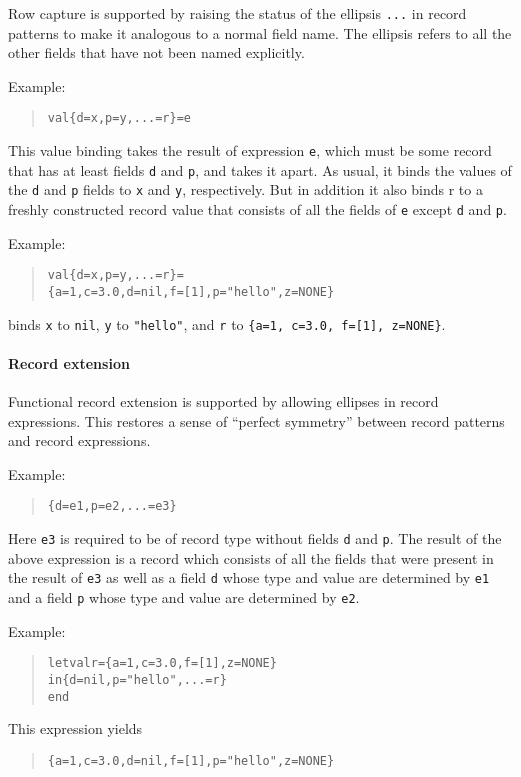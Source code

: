 \documentclass[twoside,titlepage]{article}
\begin{document}
\begin{appendix}
Row capture is supported by raising the status of the ellipsis {\tt...} in record patterns to make it analogous to a normal field name. The ellipsis refers to all the other fields that have not been named explicitly.

Example:
\begin{quote}
\begin{alltt}
val \{d=x, p=y, ...=r\} = e
\end{alltt}
\end{quote}
This value binding takes the result of expression {\tt e}, which must be some record that has at least fields {\tt d} and {\tt p}, and takes it apart. As usual, it binds the values of the {\tt d} and {\tt p} fields to {\tt x} and {\tt y}, respectively. But in addition it also binds r to a freshly constructed record value that consists of all the fields of {\tt e} except {\tt d} and {\tt p}.

Example:
\begin{quote}
\begin{alltt}
val \{d=x, p=y, ...=r\} =
    \{a=1, c=3.0, d=nil, f=[1], p="hello", z=NONE\}
\end{alltt}
\end{quote}
binds {\tt x} to {\tt nil}, {\tt y} to {\tt "hello"}, and {\tt r} to {\tt\{a=1, c=3.0, f=[1], z=NONE\}}.

\paragraph{Record extension}

Functional record extension is supported by allowing ellipses in record expressions. This restores a sense of ``perfect symmetry'' between record patterns and record expressions.

Example:
\begin{quote}
\begin{alltt}
\{d=e1, p=e2, ...=e3\}
\end{alltt}
\end{quote}
Here {\tt e3} is required to be of record type without fields {\tt d} and {\tt p}. The result of the above expression is a record which consists of all the fields that were present in the result of {\tt e3} as well as a field {\tt d} whose type and value are determined by {\tt e1} and a field {\tt p} whose type and value are determined by {\tt e2}.

Example:
\begin{quote}
\begin{alltt}
let val r = \{a=1, c=3.0, f=[1], z=NONE\}
in \{d=nil, p="hello", ...=r\}
end
\end{alltt}
\end{quote}
This expression yields
\begin{quote}
\begin{alltt}
\{a=1, c=3.0, d=nil, f=[1], p="hello", z=NONE\}
\end{alltt}
\end{quote}


\end{appendix}
\end{document}
